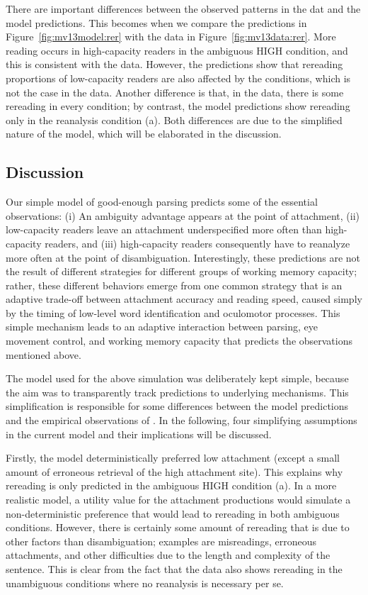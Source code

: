 \documentclass{cambridge7A}\usepackage[]{graphicx}\usepackage[]{color}
\begin{document}
There are important differences between the observed patterns in the dat and the model predictions. This becomes when we compare the predictions in Figure~\ref{fig:mv13model:rer} with the data in Figure~\ref{fig:mv13data:rer}. More reading occurs in high-capacity readers in the ambiguous HIGH condition, and this is consistent with the data. However, the predictions show that rereading proportions of low-capacity readers are also affected by the conditions, which is not the case in the data. Another difference is that, in the data, there is some rereading in every condition; by contrast, the model predictions show rereading only in the reanalysis condition (a). Both differences are due to the simplified nature of the model, which will be elaborated in the discussion.


\subsection{Discussion}
Our simple model of good-enough parsing predicts some of the essential observations: (i) An ambiguity advantage appears at the point of attachment, (ii) low-capacity readers leave an attachment underspecified more often than high-capacity readers, and (iii) high-capacity readers consequently have to reanalyze more often at the point of disambiguation.
Interestingly, these predictions are not the result of different strategies for different groups of working memory capacity; rather, these different behaviors emerge from one common strategy that is an adaptive trade-off between attachment accuracy and reading speed, caused simply by the timing of low-level word identification and oculomotor processes. This simple mechanism leads to an adaptive interaction between parsing, eye movement control, and working memory capacity that predicts the observations mentioned above.

The model used for the above simulation was deliberately kept simple, because the aim was to transparently track predictions to underlying mechanisms. This simplification is responsible for some differences between the model predictions and the empirical observations of \cite{MalsburgVasishth2013}. In the following, four simplifying assumptions in the current model and their implications will be discussed.

Firstly, the model deterministically preferred low attachment (except a small amount of erroneous retrieval of the high attachment site). This explains why rereading is only predicted in the ambiguous HIGH condition (a). In a more realistic model, a utility value for the attachment productions would simulate a non-deterministic preference that would lead to rereading in both ambiguous conditions. However, there is certainly some amount of rereading that is due to other factors than disambiguation; examples are misreadings, erroneous attachments, and other difficulties due to the length and complexity of the sentence. This is clear from the fact that the data also shows rereading in the unambiguous conditions where no reanalysis is necessary per se.
\end{document}
